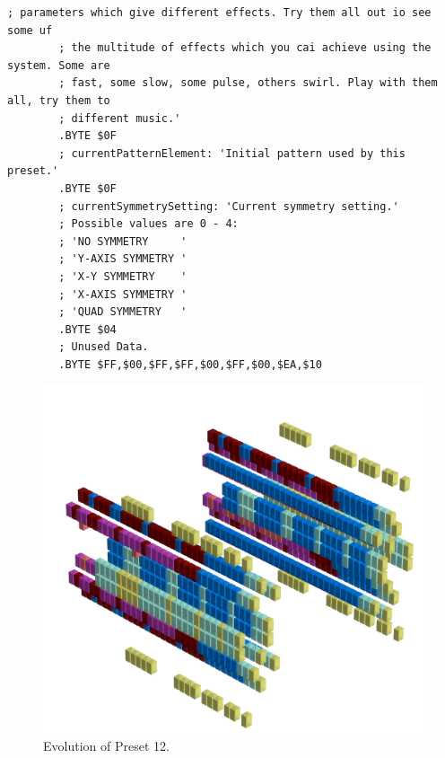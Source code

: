 \begin{lstlisting}[basicstyle=\tiny,caption=Source code for Preset 11.]
        ; parameters which give different effects. Try them all out io see some uf
        ; the multitude of effects which you cai achieve using the system. Some are
        ; fast, some slow, some pulse, others swirl. Play with them all, try them to
        ; different music.'
        .BYTE $0F
        ; currentPatternElement: 'Initial pattern used by this preset.'
        .BYTE $0F
        ; currentSymmetrySetting: 'Current symmetry setting.'
        ; Possible values are 0 - 4:
        ; 'NO SYMMETRY     '
        ; 'Y-AXIS SYMMETRY '
        ; 'X-Y SYMMETRY    '
        ; 'X-AXIS SYMMETRY '
        ; 'QUAD SYMMETRY   '
        .BYTE $04
        ; Unused Data.
        .BYTE $FF,$00,$FF,$FF,$00,$FF,$00,$EA,$10
\end{lstlisting}


\clearpage                                                                 
\begin{figure}[H]                                                          
    \centering                                                             
    \begin{adjustbox}{width=14cm,center}                                   
      \includegraphics[width=14cm]{src/presets/pattern12-45.png}%
    \end{adjustbox}                                                        
\caption{Evolution of Preset 12.}                                           
\end{figure}                                                               
\clearpage                                                                 
                                                                           
